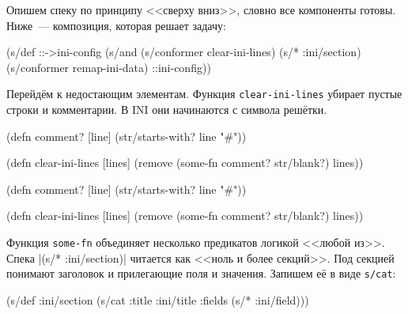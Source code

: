 Опишем спеку по принципу <<сверху вниз>>, словно все компоненты готовы. Ниже~---
композиция, которая решает задачу:

\begin{english}
  \begin{clojure}
(s/def ::->ini-config
  (s/and
   (s/conformer clear-ini-lines)
   (s/* :ini/section)
   (s/conformer remap-ini-data)
   ::ini-config))
  \end{clojure}
\end{english}


Перейдём к недостающим элементам. Функция \verb|clear-ini-lines| убирает
пустые строки и комментарии. В INI они начинаются с символа решётки.

\ifx\devicetype\mobile

\begin{english}
  \begin{clojure}
(defn comment? [line]
  (str/starts-with? line "#"))

(defn clear-ini-lines [lines]
  (remove
    (some-fn comment? str/blank?) lines))
  \end{clojure}
\end{english}

\else

\begin{english}
  \begin{clojure}
(defn comment? [line]
  (str/starts-with? line "#"))

(defn clear-ini-lines [lines]
  (remove (some-fn comment? str/blank?) lines))
  \end{clojure}
\end{english}

\fi


Функция \verb|some-fn| объединяет несколько предикатов логикой <<любой
из>>. Спека \spverb|(s/* :ini/section)| читается как <<ноль и более
секций>>. Под секцией понимают заголовок и прилегающие поля и значения. Запишем
её в виде \verb|s/cat|:

\ifx\devicetype\mobile

\begin{english}
  \begin{clojure}
(s/def :ini/section
  (s/cat :title
    :ini/title :fields (s/* :ini/field)))
  \end{clojure}
\end{english}

